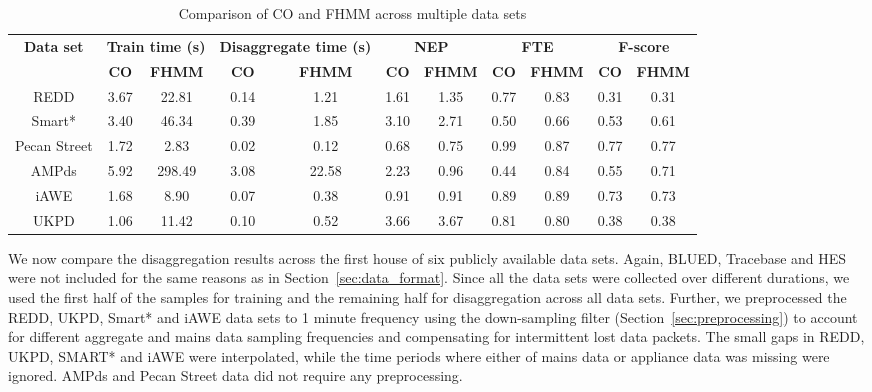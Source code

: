 \documentclass{sig-alternate}
\newcommand{\bluecolor}[1]{\textcolor{blue}{#1}}
\newcommand{\secref}[1]{Section~\ref{#1}}
\begin{document}
\begin{table}
\centering
\begin{tabular}{ccccccccccc}
\hline\textbf{Data set} & \multicolumn{2}{c}{\textbf{Train time (s)}}& \multicolumn{2}{c}{\textbf{Disaggregate time (s)}} &\multicolumn{2}{c}{\textbf{NEP}}    & \multicolumn{2}{c}{\textbf{FTE}} &\multicolumn{2}{c}{\textbf{F-score}} \\ 
~ &\textbf{CO} & \textbf{FHMM} &\textbf{CO} & \textbf{FHMM} &\textbf{CO} & \textbf{FHMM} &\textbf{CO} & \textbf{FHMM}&\textbf{CO} & \textbf{FHMM} \\ \hline 
REDD &3.67 &22.81 &0.14 &1.21 &1.61 &1.35 &0.77 &0.83 &0.31 &0.31\\ 
Smart* &3.40 &46.34 &0.39 &1.85 &3.10 &2.71 &0.50 &0.66 &0.53 &0.61\\ 
Pecan Street &1.72 &2.83 &0.02 &0.12 &0.68 &0.75 &0.99 &0.87 &0.77 &0.77\\ 
AMPds &5.92 &298.49 &3.08 &22.58 &2.23 &0.96 &0.44 &0.84 &0.55 &0.71\\ 
iAWE &1.68 &8.90 &0.07 &0.38 &0.91 &0.91 &0.89 &0.89 &0.73 &0.73\\ 
UKPD &1.06 &11.42 &0.10 &0.52 &3.66 &3.67 &0.81 &0.80 &0.38 &0.38\\
\hline
\end{tabular}
\caption{Comparison of CO and FHMM across multiple data sets}
\label{table:disaggregation}
\end{table}

\noindent
We now compare the disaggregation results across the first house of six publicly available data sets. Again, BLUED, Tracebase and HES were not included for the same reasons as in \secref{sec:data_format}. Since all the data sets were collected over different durations, we used the first half of the samples for training and the remaining half for disaggregation across all data sets. Further, we preprocessed  the REDD, UKPD, Smart* and iAWE data sets to 1 minute frequency using the down-sampling filter (\secref{sec:preprocessing}) to account for different aggregate and mains data sampling frequencies and compensating for intermittent lost data packets. The small gaps in REDD, UKPD, SMART* and iAWE were interpolated, while the time periods where either of mains data or appliance data was missing were ignored. AMPds and Pecan Street data did not require any preprocessing. 
\end{document}
